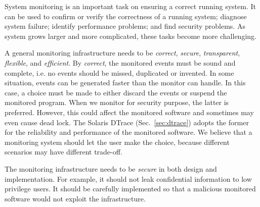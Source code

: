 
System monitoring is an important task on ensuring a correct running
system.
It can be used to confirm or verify the correctness of a running system;
diagnose system failure;
identify performance problems;
and find security problems.
As system grows larger and more complicated, these tasks become more
challenging.

A general monitoring infrastructure needs to be
{\em correct}, {\em secure}, {\em transparent}, {\em flexible}, and {\em efficient}.
By {\em correct}, the monitored events must be sound and complete, i.e.
no events should be missed, duplicated or invented.
In some situation, events can be generated faster than the monitor can handle.
In this case, a choice must be made to either discard the events
or suspend the monitored program.
When we monitor for security purpose, the latter is preferred.
However, this could affect the monitored software and sometimes may even
cause dead lock.
The Solaris DTrace (Sec.~\ref{sec:dtrace}) adopts the former for the
reliability and performance of the monitored software.
We believe that a monitoring system should let the user make the choice,
because different scenarios may have different trade-off.

The monitoring infrastructure needs to be {\em secure} in both design and implementation.
For example, it should not leak confidential information to low privilege users.
It should be carefully implemented so that a malicious monitored
software would not exploit the infrastructure.

